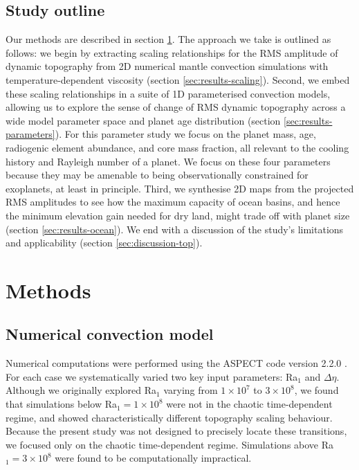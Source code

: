 \subsection{Study outline}





Our methods are described in section \ref{sec:methods}. The approach we take is outlined as follows: we begin by extracting scaling relationships for the RMS amplitude of dynamic topography from 2D numerical mantle convection simulations with temperature-dependent viscosity (section \ref{sec:results-scaling}). Second, we embed these scaling relationships in a suite of 1D parameterised convection models, allowing us to explore the sense of change of RMS dynamic topography across a wide model parameter space and planet age distribution (section \ref{sec:results-parameters}). For this parameter study we focus on the planet mass, age, radiogenic element abundance, and core mass fraction, all relevant to the cooling history and Rayleigh number of a planet. We focus on these four parameters because they may be amenable to being observationally constrained for exoplanets, at least in principle. Third, we synthesise 2D maps from the projected RMS amplitudes to see how the maximum capacity of ocean basins, and hence the minimum elevation gain needed for dry land, might trade off with planet size (section \ref{sec:results-ocean}). We end with a discussion of the study's limitations and applicability (section \ref{sec:discussion-top}).



\section{Methods} \label{sec:methods}

\subsection{Numerical convection model} \label{sec:methods-numerical}

Numerical computations were performed using the ASPECT code version 2.2.0 \citep{KHB12,heister_high_2017, bangerth_aspect_2020}. For each case we systematically varied two key input parameters: Ra$_1$ and $\Delta \eta$. Although we originally explored Ra$_1$ varying from $1 \times 10^7$ to $3 \times 10^8$, we found that simulations below Ra$_1 = 1 \times 10^8$ were not in the chaotic time-dependent regime, and showed characteristically different topography scaling behaviour. Because the present study was not designed to precisely locate these transitions, we focused only on the chaotic time-dependent regime. Simulations above Ra$_1 = 3 \times 10^8$ were found to be computationally impractical.

